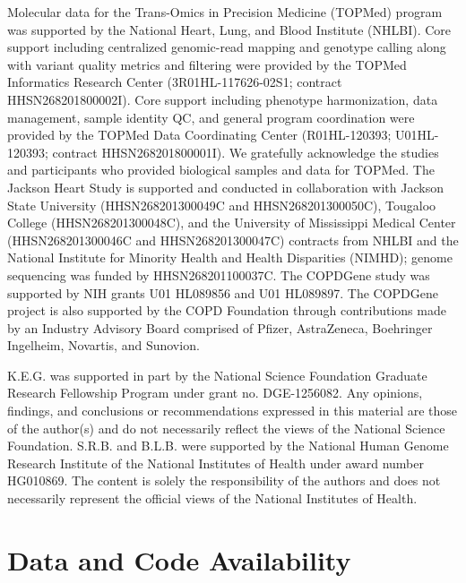 \documentclass[12pt]{article}
\newcommand{\edit}[1]{{\color{red}{#1}}}
\begin{document}
Molecular data for the Trans-Omics in Precision Medicine (TOPMed) program was supported by the National Heart, Lung, and Blood Institute (NHLBI). 
Core support including centralized genomic-read mapping and genotype calling along with variant quality metrics and filtering were provided by the TOPMed Informatics Research Center (3R01HL-117626-02S1; contract HHSN268201800002I). 
Core support including phenotype harmonization, data management, sample identity QC, and general program coordination were provided by the TOPMed Data Coordinating Center (R01HL-120393; U01HL-120393; contract HHSN268201800001I). 
We gratefully acknowledge the studies and participants who provided biological samples and data for TOPMed. 
The Jackson Heart Study is supported and conducted in collaboration with Jackson State University (HHSN268201300049C and HHSN268201300050C), Tougaloo College (HHSN268201300048C), and the University of Mississippi Medical Center (HHSN268201300046C and HHSN268201300047C) contracts from NHLBI and the National Institute for Minority Health and Health Disparities (NIMHD); genome sequencing was funded by HHSN268201100037C. 
The COPDGene study was supported by NIH grants U01 HL089856 and U01 HL089897. The COPDGene project is also supported by the COPD Foundation through contributions made by an Industry Advisory Board comprised of Pfizer, AstraZeneca, Boehringer Ingelheim, Novartis, and Sunovion.

K.E.G. was supported in part by the National Science Foundation Graduate Research Fellowship Program under grant no. DGE-1256082. Any opinions, findings, and conclusions or recommendations expressed in this material are those of the author(s) and do not necessarily reflect the views of the National Science Foundation.
S.R.B. and B.L.B. were supported by the National Human Genome Research Institute of the National Institutes of Health under award number HG010869. The content is solely the responsibility of the authors and does not necessarily represent the official views of the National Institutes of Health.





\section{Data and Code Availability}

\end{document}
